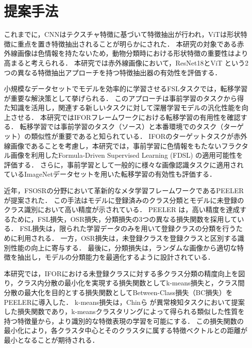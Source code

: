 \documentclass[uplatex,dvipdfmx,10pt,twocolumn]{jsarticle}
\begin{document}
\section{提案手法}

これまでに，CNNはテクスチャ特徴に基づいて特徴抽出が行われ，ViTは形状特徴に重点を置き特徴抽出されることが明らかにされた．
本研究の対象である赤外線画像は色情報を持たないため，動物分類時における形状特徴の重要性はより高まると考えられる．
本研究では赤外線画像において，ResNet18とViT という2 つの異なる特徴抽出アプローチを持つ特徴抽出器の有効性を評価する．

小規模なデータセットでモデルを効率的に学習させるFSLタスクでは，転移学習が重要な解決策として挙げられる．
このアプローチは事前学習のタスクから得た知識を活用し，関連する新しいタスクに対して深層学習モデルの汎化性能を向上させる．
本研究ではIFORフレームワークにおける転移学習の有用性を確認する．
転移学習では事前学習のタスク（ソース）と本番環境でのタスク（ターゲット）の類似性が重要であると知られている．
IFORのターゲットタスクが赤外線画像であることを考慮し，本研究では，事前学習に色情報をもたないフラクタル画像を利用したFormula-Driven Supervised Learning (FDSL) の適用可能性を評価する．
さらに，事前学習として一般的に様々な画像認識タスクに適用されているImageNetデータセットを用いた転移学習の有効性も評価する．

近年，FSOSRの分野において革新的なメタ学習フレームワークであるPEELER \cite{peeler}が提案された．
この手法はモデルに登録済みのクラス分類とモデルに未登録のクラス識別において高い精度が示されている．
PEELER は，高い精度を達成するために，FSL損失，OSR損失，分類損失の3つの異なる損失関数を採用している．
FSL損失は，限られた学習データのみを用いて登録クラスの分類を行うために利用される．
一方，OSR損失は，未登録クラスを登録クラスと区別する識別性能の向上に寄与する．
最後に，分類損失は，ランダムな画像から適切な特徴を抽出し，モデルの分類能力を最適化するように設計されている．

本研究では，IFORにおける未登録クラスに対する多クラス分類の精度向上を図り，クラス内分散の最小化を実現する損失関数としてk-means損失と，クラス間分散の最大化を目的とする損失関数としてBetween-Class損失（BC損失）をPEELERに導入した．
k-means損失は，Chinら \cite{k-means}が異常検知タスクにおいて提案した損失関数であり，k-meansクラスタリングによって得られる類似した性質を持つ特徴量から，より識別的な特徴表現の学習を可能にする．
この損失関数の最小化により，各クラスタ中心とそのクラスタに属する特徴ベクトルとの距離が最小となることが期待される．
\end{document}
